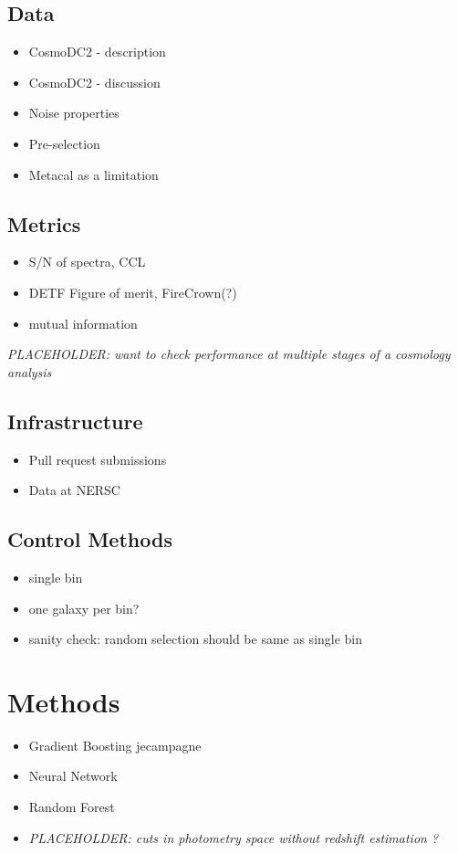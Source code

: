 \documentclass[twocolumn,twocolappendix]{aastex63}
\newcommand{\placeholder}[1]{\textit{PLACEHOLDER: #1}}
\begin{document}
\subsection{Data}

\begin{itemize}
    \item CosmoDC2 - description
    \item CosmoDC2 - discussion
    \item Noise properties
    \item Pre-selection 
    \item Metacal as a limitation
\end{itemize}

\subsection{Metrics}
\label{sec:metrics}


\begin{itemize}
    \item S/N of spectra, CCL
    \item DETF Figure of merit, FireCrown(?)
    \item mutual information
\end{itemize}


\placeholder{want to check performance at multiple stages of a cosmology analysis}

\subsection{Infrastructure}
\begin{itemize}
    \item Pull request submissions
    \item Data at NERSC
\end{itemize}


\subsection{Control Methods}
\begin{itemize}
    \item single bin
    \item one galaxy per bin?
    \item sanity check: random selection should be same as single bin
\end{itemize}


\section{Methods}
\begin{itemize}
    \item Gradient Boosting \@ jecampagne
    \item Neural Network \@EiffL
    \item Random Forest
    \item \placeholder{cuts in photometry space without redshift estimation \@barber?}
\end{itemize}
\end{document}
